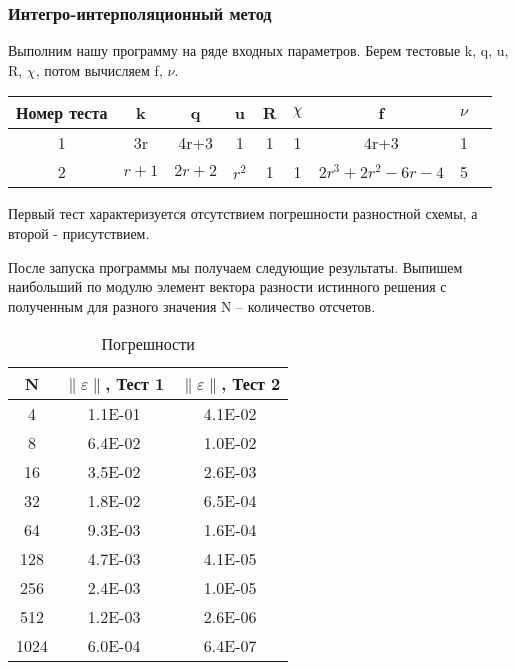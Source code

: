 \subsubsection{Интегро-интерполяционный метод}

Выполним нашу программу на ряде входных параметров. Берем тестовые k, q, u, R, $\chi$, потом вычисляем f, $\nu$.

\begin{table}[H]
  \centering
  \begin{tabular}{ c | *{8}c }
    \toprule
    Номер теста & k & q & u & R & $\chi $ & f & $\nu $ \\
    \midrule
    1 & 3r & 4r+3 & 1 & 1 & 1 & 4r+3 & 1 \\
    \midrule
    2 & $ r+1 $ & $ 2r+2 $ & $ r^2 $ & 1 & 1 & $ 2r^3+2r^2-6r-4 $ & 5 \\
    \bottomrule
  \end{tabular}
\end{table}

Первый тест характеризуется отсутствием погрешности разностной схемы, а второй - присутствием.

После запуска программы мы получаем следующие результаты. Выпишем наибольший по модулю  элемент вектора разности истинного решения с полученным для разного значения N – количество отсчетов.

  \begin{table}[H]
    \centering
    \begin{tabular}{c | c | c}
      \toprule
      N & $ \left\lVert \varepsilon \right\rVert  $, Тест 1 & $ \left\lVert \varepsilon \right\rVert  $, Тест 2 \\
      \midrule
4 & 1.1E-01 & 4.1E-02 \\
8 & 6.4E-02 & 1.0E-02 \\
16 & 3.5E-02 & 2.6E-03 \\
32 & 1.8E-02 & 6.5E-04 \\
64 & 9.3E-03 & 1.6E-04 \\
128 & 4.7E-03 & 4.1E-05 \\
256 & 2.4E-03 & 1.0E-05 \\
512 & 1.2E-03 & 2.6E-06 \\
1024 & 6.0E-04 & 6.4E-07 \\
      \bottomrule
    \end{tabular}
    \caption{Погрешности}
  \end{table}

